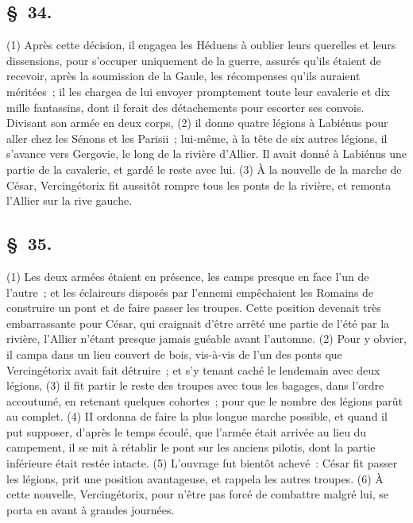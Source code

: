 \documentclass[french,twoside]{book} %
\begin{document}
\subsection[{§ 34.}]{ \textsc{§ 34.} }
\noindent (1) Après cette décision, il engagea les Héduens à oublier leurs querelles et leurs dissensions, pour s’occuper uniquement de la guerre, assurés qu’ils étaient de recevoir, après la soumission de la Gaule, les récompenses qu’ils auraient méritées ; il les chargea de lui envoyer promptement toute leur cavalerie et dix mille fantassins, dont il ferait des détachements pour escorter ses convois. Divisant son armée en deux corps, (2) il donne quatre légions à Labiénus pour aller chez les Sénons et les Parisii ; lui-même, à la tête de six autres légions, il s’avance vers Gergovie, le long de la rivière d’Allier. Il avait donné à Labiénus une partie de la cavalerie, et gardé le reste avec lui. (3) À la nouvelle de la marche de César, Vercingétorix fit aussitôt rompre tous les ponts de la rivière, et remonta l’Allier sur la rive gauche.
\subsection[{§ 35.}]{ \textsc{§ 35.} }
\noindent (1) Les deux armées étaient en présence, les camps presque en face l’un de l’autre ; et les éclaireurs disposés par l’ennemi empêchaient les Romains de construire un pont et de faire passer les troupes. Cette position devenait très embarrassante pour César, qui craignait d’être arrêté une partie de l’été par la rivière, l’Allier n’étant presque jamais guéable avant l’automne. (2) Pour y obvier, il campa dans un lieu couvert de bois, vis-à-vis de l’un des ponts que Vercingétorix avait fait détruire ; et s’y tenant caché le lendemain avec deux légions, (3) il fit partir le reste des troupes avec tous les bagages, dans l’ordre accoutumé, en retenant quelques cohortes ; pour que le nombre des légions parût au complet. (4) II ordonna de faire la plus longue marche possible, et quand il put supposer, d’après le temps écoulé, que l’armée était arrivée au lieu du campement, il se mit à rétablir le pont sur les anciens pilotis, dont la partie inférieure était restée intacte. (5) L'ouvrage fut bientôt achevé : César fit passer les légions, prit une position avantageuse, et rappela les autres troupes. (6) À cette nouvelle, Vercingétorix, pour n’être pas forcé de combattre malgré lui, se porta en avant à grandes journées.
\end{document}
